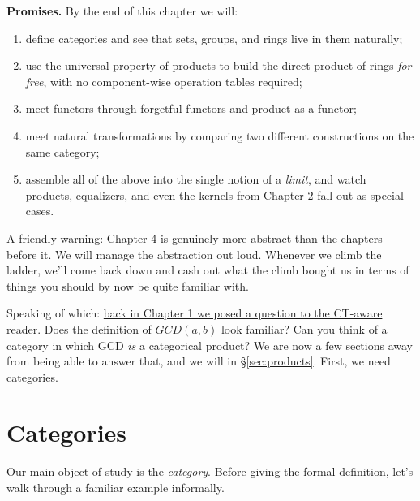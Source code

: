 \noindent \textbf{Promises.} By the end of this chapter we will:
\begin{enumerate}[label=\roman*)]
    \item define categories and see that sets, groups, and rings live in them naturally;
    \item use the universal property of products to build the direct product of rings
    \textit{for free}, with no component-wise operation tables required;
    \item meet functors through forgetful functors and product-as-a-functor;
    \item meet natural transformations by comparing two different constructions on the same
    category;
    \item assemble all of the above into the single notion of a \textit{limit}, and watch
    products, equalizers, and even the kernels from Chapter 2 fall out as special cases.
\end{enumerate}

\noindent A friendly warning: Chapter 4 is genuinely more abstract than the chapters before
it. We will manage the abstraction out loud. Whenever we climb the ladder, we'll come back
down and cash out what the climb bought us in terms of things you should by now be quite
familiar with.

Speaking of which: \hyperref[note:ch1-gcd-teaser]{back in Chapter 1 we posed a question to
the CT-aware reader}. Does the definition of $GCD(a,b)$ look familiar? Can you think of a
category in which GCD \textit{is} a categorical product? We are now a few sections away from
being able to answer that, and we will in \S\ref{sec:products}. First, we need categories.

\section{Categories}\label{sec:categories}
Our main object of study is the \textit{category}. Before giving the formal
definition, let's walk through a familiar example informally.

